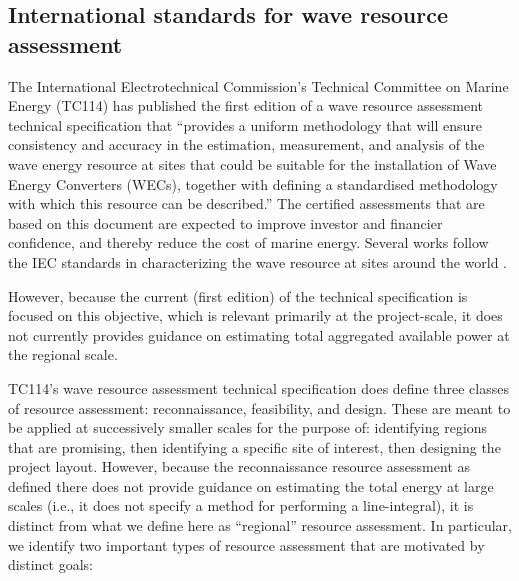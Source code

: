 \subsection{International standards for wave resource assessment}


The International Electrotechnical Commission's Technical Committee on
Marine Energy (TC114) has published the first edition of a wave
resource assessment technical specification that ``provides a uniform
methodology that will ensure consistency and accuracy in the
estimation, measurement, and analysis of the wave energy resource at
sites that could be suitable for the installation of Wave Energy
Converters (WECs), together with defining a standardised methodology
with which this resource can be described.'' The certified assessments
that are based on this document are expected to improve investor and
financier confidence, and thereby reduce the cost of marine
energy. Several works follow the IEC standards in characterizing the
wave resource at sites around the world
\citep{zhengAssessingChinaSea2013,neillWavePowerVariability2013,iglesiasWaveEnergyPotential2009,sierraWaveEnergyResource2013,robertsonCharacterizingShoreWave2014,internationalelectrotechnicalcommissionPart101Wave2015,yangCharacteristicsVariabilityNearshore2020,lokuliyana_sri_2020}.

However, because the current (first edition) of the
technical specification is focused on this objective, which is
relevant primarily at the project-scale, it does not currently
provides guidance on estimating total aggregated available power at the regional
scale.

TC114's wave resource assessment technical specification does define
three classes of resource assessment: reconnaissance, feasibility, and
design. These are meant to be applied at successively smaller scales
for the purpose of: identifying regions that are promising, then
identifying a specific site of interest, then designing the project
layout. However, because the reconnaissance resource
assessment as defined there does not provide guidance on estimating
the total energy at large scales (i.e., it does not specify a method
for performing a line-integral), it is distinct from what we define
here as ``regional'' resource assessment. In particular, we identify
two important types of resource assessment that are motivated by
distinct goals:

